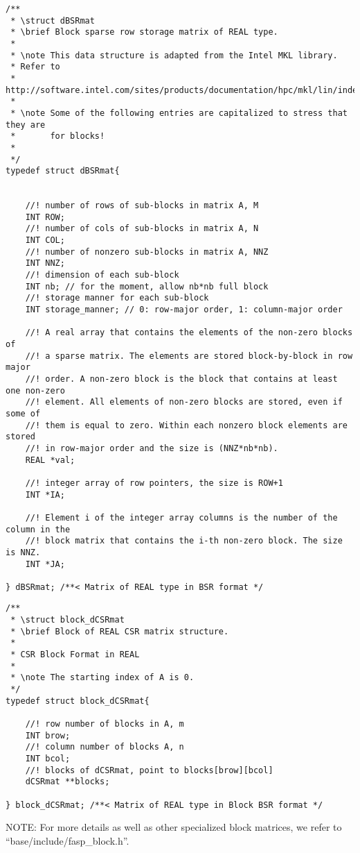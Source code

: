 \documentclass[11pt]{memoir}
\begin{document}
\begin{lstlisting}
/**
 * \struct dBSRmat
 * \brief Block sparse row storage matrix of REAL type.
 *
 * \note This data structure is adapted from the Intel MKL library.
 * Refer to
 * http://software.intel.com/sites/products/documentation/hpc/mkl/lin/index.htm
 *
 * \note Some of the following entries are capitalized to stress that they are
 *       for blocks!
 *
 */
typedef struct dBSRmat{
	

	//! number of rows of sub-blocks in matrix A, M
	INT ROW;
	//! number of cols of sub-blocks in matrix A, N
	INT COL;
	//! number of nonzero sub-blocks in matrix A, NNZ
	INT NNZ;
	//! dimension of each sub-block
	INT nb; // for the moment, allow nb*nb full block
	//! storage manner for each sub-block
	INT storage_manner; // 0: row-major order, 1: column-major order
	
	//! A real array that contains the elements of the non-zero blocks of
	//! a sparse matrix. The elements are stored block-by-block in row major
	//! order. A non-zero block is the block that contains at least one non-zero
	//! element. All elements of non-zero blocks are stored, even if some of
	//! them is equal to zero. Within each nonzero block elements are stored
	//! in row-major order and the size is (NNZ*nb*nb).
	REAL *val;
	
	//! integer array of row pointers, the size is ROW+1
	INT *IA;
	
	//! Element i of the integer array columns is the number of the column in the
	//! block matrix that contains the i-th non-zero block. The size is NNZ.
	INT *JA;
	
} dBSRmat; /**< Matrix of REAL type in BSR format */
\end{lstlisting}
%
\begin{lstlisting}
/**
 * \struct block_dCSRmat
 * \brief Block of REAL CSR matrix structure.
 *
 * CSR Block Format in REAL
 *
 * \note The starting index of A is 0.
 */
typedef struct block_dCSRmat{
	
	//! row number of blocks in A, m
	INT brow;
	//! column number of blocks A, n
	INT bcol;
	//! blocks of dCSRmat, point to blocks[brow][bcol]
	dCSRmat **blocks;
	
} block_dCSRmat; /**< Matrix of REAL type in Block BSR format */
\end{lstlisting}
%

\begin{snugshade}\noindent
NOTE: For more details as well as other specialized block matrices, we refer to ``base/include/fasp\_block.h''.
\end{snugshade}
\end{document}

